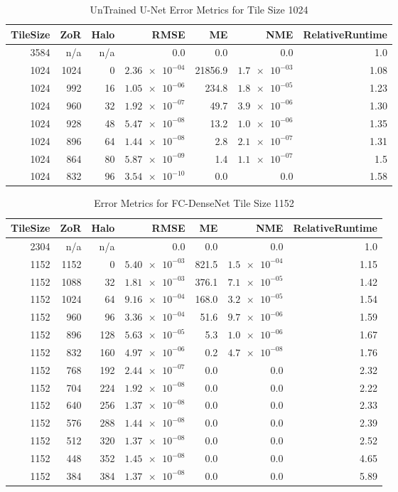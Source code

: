 \begin{table}[h!]
	\centering
	\caption{UnTrained U-Net Error Metrics for Tile Size 1024}
	\label{tab:tile_size_1024}
	\begin{tabular}{r|r|r|r|r|r|r}
		TileSize & ZoR & Halo & RMSE    & ME & NME & RelativeRuntime \\ 
		\hline
		3584 & n/a & n/a & 0.0 & 0.0 & 0.0 & 1.0 \\
		1024 & 1024 & 0 & $\num{2.36e-04}$ & 21856.9 & $\num{1.7e-03}$ & 1.08 \\
		1024 & 992 & 16 & $\num{1.05e-06}$ & 234.8 & $\num{1.8e-05}$ & 1.23 \\
		1024 & 960 & 32 & $\num{1.92e-07}$ & 49.7 & $\num{3.9e-06}$ & 1.30 \\
		1024 & 928 & 48 & $\num{5.47e-08}$ & 13.2 & $\num{1.0e-06}$ & 1.35 \\
		1024 & 896 & 64 & $\num{1.44e-08}$ & 2.8 & $\num{2.1e-07}$ & 1.31 \\
		1024 & 864 & 80 & $\num{5.87e-09}$ & 1.4 & $\num{1.1e-07}$ & 1.5 \\
		1024 & 832 & 96 & $\num{3.54e-10}$ & 0.0 & 0.0 & 1.58 \\
	\end{tabular}
\end{table}


\begin{table}[h!]
	\centering
	\caption{Error Metrics for FC-DenseNet Tile Size 1152}
	\label{tab:tile_size_1152}
	\begin{tabular}{r|r|r|r|r|r|r}
		TileSize & ZoR & Halo & RMSE    & ME & NME & RelativeRuntime \\ 
		\hline
		2304 & n/a & n/a & 0.0 & 0.0 & 0.0 & 1.0 \\
		1152 & 1152 & 0 & $\num{5.40e-03}$ & 821.5 & $\num{1.5e-04}$ & 1.15 \\
		1152 & 1088 & 32 & $\num{1.81e-03}$ & 376.1 & $\num{7.1e-05}$ & 1.42 \\
		1152 & 1024 & 64 & $\num{9.16e-04}$ & 168.0 & $\num{3.2e-05}$ & 1.54 \\
		1152 & 960 & 96 & $\num{3.36e-04}$ & 51.6 & $\num{9.7e-06}$ & 1.59 \\
		1152 & 896 & 128 & $\num{5.63e-05}$ & 5.3 & $\num{1.0e-06}$ & 1.67 \\
		1152 & 832 & 160 & $\num{4.97e-06}$ & 0.2 & $\num{4.7e-08}$ & 1.76 \\
		1152 & 768 & 192 & $\num{2.44e-07}$ & 0.0 & 0.0 & 2.32 \\
		1152 & 704 & 224 & $\num{1.92e-08}$ & 0.0 & 0.0 & 2.22 \\
		1152 & 640 & 256 & $\num{1.37e-08}$ & 0.0 & 0.0 & 2.33 \\
		1152 & 576 & 288 & $\num{1.44e-08}$ & 0.0 & 0.0 & 2.39 \\
		1152 & 512 & 320 & $\num{1.37e-08}$ & 0.0 & 0.0 & 2.52 \\
		1152 & 448 & 352 & $\num{1.45e-08}$ & 0.0 & 0.0 & 4.65 \\
		1152 & 384 & 384 & $\num{1.37e-08}$ & 0.0 & 0.0 & 5.89 \\
	\end{tabular}
\end{table}

